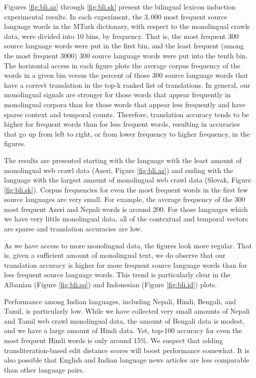 \documentclass[11pt]{article}
\begin{document}
Figures \ref{fig:bli.az} through \ref{fig:bli.sk} present the bilingual lexicon induction experimental results. In each experiment, the $3,000$ most frequent source language words in the MTurk dictionary, with respect to the monolingual crawls data, were divided into 10 bins, by frequency. That is, the most frequent 300 source language words were put in the first bin, and the least frequent (among the most frequent 3000) 300 source language words were put into the tenth bin. The horizontal access in each figure plots the average corpus frequency of the words in a given bin versus the percent of those 300 source language words that have a correct translation in the top-k ranked list of translations. In general, our monolingual signals are stronger for those words that appear frequently in monolingual corpora than for those words that appear less frequently and have sparse context and temporal counts. Therefore, translation accuracy tends to be higher for frequent words than for less frequent words, resulting in accuracies that go up from left to right, or from lower frequency to higher frequency, in the figures.
 
The results are presented starting with the language with the least amount of monolingual web crawl data (Azeri, Figure \ref{fig:bli.az}) and ending with the language with the largest amount of monolingual web crawl data (Slovak, Figure \ref{fig:bli.sk}). Corpus frequencies for even the most frequent words in the first few source languages are very small. For example, the average frequency of the 300 most frequent Azeri and Nepali words is around 200. For those languages which we have very little monolingual data, all of the contextual and temporal vectors are sparse and translation accuracies are low.

As we have access to more monolingual data, the figures look more regular. That is, given a sufficient amount of monolingual text, we do observe that our translation accuracy is higher for more frequent source language words than for less frequent source language words. This trend is particularly clear in the Albanian (Figure \ref{fig:bli.sq}) and Indonesian (Figure \ref{fig:bli.id}) plots.

Performance among Indian languages, including Nepali, Hindi, Bengali, and Tamil, is particularly low. While we have collected very small amounts of Nepali and Tamil web crawl monolingual data, the amount of Bengali data is modest, and we have a large amount of Hindi data. Yet, top-100 accuracy for even the most frequent Hindi words is only around 15\%. We suspect that adding transliteration-based edit distance scores will boost performance somewhat. It is also possible that English and Indian language news articles are less comparable than other language pairs. 
\end{document}
